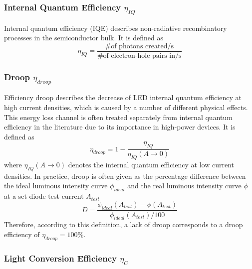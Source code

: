 \documentclass[parskip=full]{article}
\begin{document}
\subsubsection{Internal Quantum Efficiency $\eta_{IQ}$}

Internal quantum efficiency (IQE) describes non-radiative recombinatory processes in the semiconductor bulk. It is defined as
%
\begin{equation}
    \eta_{IQ} = \frac{\# \text{of photons created/s}}{\# \text{of electron-hole pairs in/s}}
\end{equation}

\subsubsection{Droop $\eta_{droop}$}

Efficiency droop describes the decrease of LED internal quantum efficiency at high current densities, which is caused by a number of different physical effects\cite{David2020}. This energy loss channel is often treated separately from internal quantum efficiency in the literature due to its importance in high-power devices. It is defined as
%
\begin{equation}
    \eta_{droop} = 1 - \frac{\eta_{IQ}}{\eta_{IQ}(A \rightarrow 0)}
\end{equation}
%
where $\eta_{IQ}(A \rightarrow 0)$ denotes the internal quantum efficiency at low current densities. In practice, droop is often given as the percentage difference between the ideal luminous intensity curve $\phi_{ideal}$ and the real luminous intensity curve $\phi$ at a set diode test current $A_{test}$
%
\begin{equation}
\label{eqn:droop}
    D = \frac{\phi_{ideal}(A_{test})-\phi(A_{test})}{\phi_{ideal}(A_{test})/100}
\end{equation}
%
Therefore, according to this definition, a lack of droop corresponds to a droop efficiency of $\eta_{droop} = 100\%$\cite{schubert2018light}\cite{tsao2010solid}.

\subsubsection{Light Conversion Efficiency $\eta_{C}$}
\end{document}
